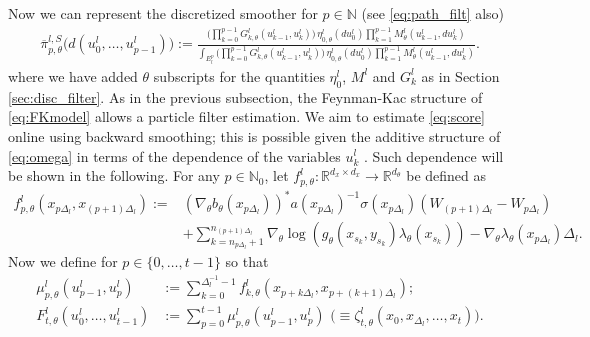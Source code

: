 \documentclass[english]{article}
\begin{document}

Now we can represent the discretized smoother for $p\in\mathbb{N}$ (see \eqref{eq:path_filt} also)
\begin{align}
\label{eq:FKmodel}
\overline{\pi}_{p,\theta}^{l,S}\big(d(u_{0}^l,\dots,u_{p-1}^l)\big) :=  \frac{\big(\prod_{k=0}^{p-1} G_{k,\theta}^l(u_{k-1}^l,u_{k}^l)\big)\,\eta_{0,\theta}^l(du_{0}^l)\prod_{k=1}^{p-1} M_{\theta}^{l}(u_{k-1}^l,du_{k}^l)}
{\int_{E_l^{p}}\big(\prod_{k=0}^{p-1} G_{k,\theta}^l(u_{k-1}^l,u_{k}^l)\big)\,\eta_{0,\theta}^l(du_{0}^l)\prod_{k=1}^{p-1} M_{\theta}^{l}(u_{k-1}^l,du_{k}^l)}.
\end{align}
where we have added $\theta$ subscripts for the quantities $\eta_0^l$, $M^l$ and $G_k^l$ as in Section \ref{sec:disc_filter}.
As in the previous subsection, the Feynman-Kac structure of \eqref{eq:FKmodel} allows a particle filter estimation. We aim to estimate \eqref{eq:score} online using backward smoothing; this is possible given the additive structure of \eqref{eq:omega} in terms of the dependence of the variables $u_{k}^l$ \cite{del_fb}. Such dependence will be shown in the following. For any $p \in \mathbb{N}_0$, let $f_{p,\theta}^l: \mathbb{R}^{d_x\times d_x}\rightarrow \mathbb{R}^{d_\theta}$ be defined as
\begin{align*}
f_{p,\theta}^l(x_{p\Delta_l},x_{(p+1)\Delta_l})  := &  (\nabla_{\theta}b_{\theta}(x_{p\Delta_l}))^*a(x_{p\Delta_l})^{-1}\sigma(x_{p\Delta_l})(W_{(p+1)\Delta_l}-W_{p\Delta_l})  \\[0.2cm]  &+\sum_{k=n_{p\Delta_l}+1}^{n_{(p+1)\Delta_l}} \nabla_\theta \log\left( g_{\theta}({x}_{s_k},y_{s_k})\lambda_{\theta}({x}_{s_k})\right)- \nabla_\theta \lambda_\theta(x_{p\Delta_l})\Delta_l.
\end{align*}
Now we define for $p\in \{0,\dots,t-1\}$ so that
\begin{align}
\mu_{p,\theta}^l(u_{p-1}^l,u_{p}^l) &:= \sum_{k=0}^{\Delta_l^{-1}-1}f_{k,\theta}^l(x_{p+k\Delta_l},x_{p+(k+1)\Delta_l});
\nonumber \\
F_{t,\theta}^l(u_{0}^l,\dots,u_{t-1}^l) &:= \sum_{p=0}^{t-1}\mu_{p,\theta}^l(u_{p-1}^l,u_{p}^l)\,\,\Big( \equiv \zeta_{t,\theta}^l(x_0,x_{\Delta_l},\dots,x_t)  \Big). \label{eq:defF}
\end{align}
\end{document}

